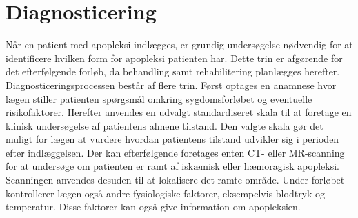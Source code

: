 
\section{Diagnosticering}

Når en patient med apopleksi indlægges, er grundig undersøgelse nødvendig for at identificere hvilken form for apopleksi patienten har. Dette trin er afgørende for det efterfølgende forløb, da behandling samt rehabilitering planlægges herefter.
Diagnosticeringsprocessen består af flere trin. Først optages en anamnese hvor lægen stiller patienten spørgsmål omkring sygdomsforløbet og eventuelle risikofaktorer. Herefter anvendes en udvalgt standardiseret skala til at foretage en klinisk undersøgelse af patientens almene tilstand. Den valgte skala gør det muligt for lægen at vurdere hvordan patientens tilstand udvikler sig i perioden efter indlæggelsen.
Der kan efterfølgende foretages enten CT- eller MR-scanning for at undersøge om patienten er ramt af iskæmisk eller hæmoragisk apopleksi. Scanningen anvendes desuden til at lokalisere det ramte område. Under forløbet kontrollerer lægen også andre fysiologiske faktorer, eksempelvis blodtryk og temperatur. Disse faktorer kan også give information om apopleksien.\cite{Sundhedsstyrelsen2009}  




